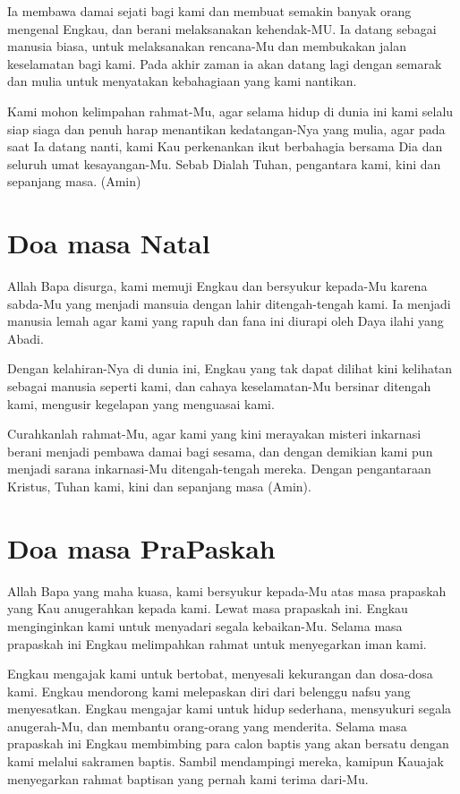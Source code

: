 \documentclass[a5paper,titlepage,11pt]{book}
\begin{document}
    Ia membawa damai sejati bagi kami dan membuat semakin banyak orang mengenal Engkau, dan berani melaksanakan kehendak-MU. Ia datang sebagai manusia biasa, untuk melaksanakan rencana-Mu dan membukakan jalan keselamatan bagi kami. Pada akhir zaman ia akan datang lagi dengan semarak dan mulia untuk menyatakan kebahagiaan yang kami nantikan.

    Kami mohon kelimpahan rahmat-Mu, agar selama hidup di dunia ini kami selalu siap siaga dan penuh harap menantikan kedatangan-Nya yang mulia, agar pada saat Ia datang nanti, kami Kau perkenankan ikut berbahagia bersama Dia dan seluruh umat kesayangan-Mu. Sebab Dialah Tuhan, pengantara kami, kini dan sepanjang masa. (Amin)
    
\section{Doa masa Natal}

    Allah Bapa disurga, kami memuji Engkau dan bersyukur kepada-Mu karena sabda-Mu yang menjadi mansuia dengan lahir ditengah-tengah kami. Ia menjadi manusia lemah agar kami yang rapuh dan fana ini diurapi oleh Daya ilahi yang Abadi.

    Dengan kelahiran-Nya di dunia ini, Engkau yang tak dapat dilihat kini kelihatan sebagai manusia seperti kami, dan cahaya keselamatan-Mu bersinar ditengah kami, mengusir kegelapan yang menguasai kami.

    Curahkanlah rahmat-Mu, agar kami yang kini merayakan misteri inkarnasi berani menjadi pembawa damai bagi sesama, dan dengan demikian kami pun menjadi sarana inkarnasi-Mu ditengah-tengah mereka. Dengan pengantaraan Kristus, Tuhan kami, kini dan sepanjang masa (Amin).
    
\section{Doa masa PraPaskah}    

    Allah Bapa yang maha kuasa, kami bersyukur kepada-Mu atas masa prapaskah yang Kau anugerahkan kepada kami. Lewat masa prapaskah ini. Engkau menginginkan kami untuk menyadari segala kebaikan-Mu. Selama masa prapaskah ini Engkau melimpahkan rahmat untuk menyegarkan iman kami.

    Engkau mengajak kami untuk bertobat, menyesali kekurangan dan dosa-dosa kami. Engkau mendorong kami melepaskan diri dari belenggu nafsu yang menyesatkan. Engkau mengajar kami untuk hidup sederhana, mensyukuri segala anugerah-Mu, dan membantu orang-orang yang menderita. Selama masa prapaskah ini Engkau membimbing para calon baptis yang akan bersatu dengan kami melalui sakramen baptis. Sambil mendampingi mereka, kamipun Kauajak menyegarkan rahmat baptisan yang pernah kami terima dari-Mu.
\end{document}
